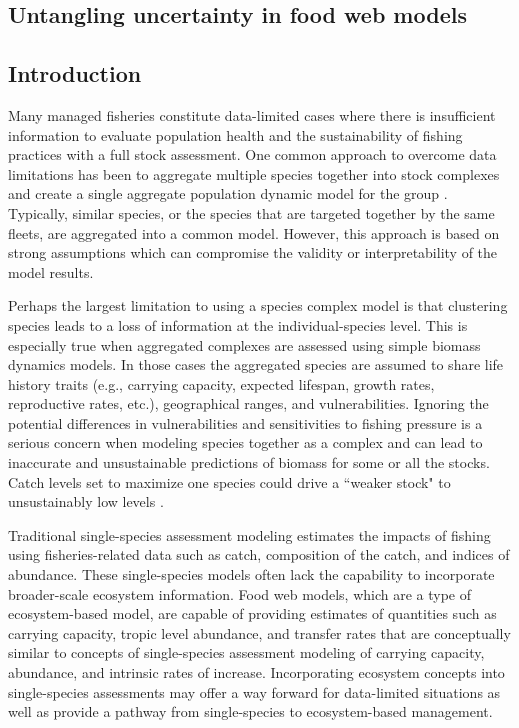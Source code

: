 \documentclass[oneside,12pt,final]{sty/ucthesis-CA2012}
\let\cite\citep                             %
\begin{document}
\begin{mainmatter}
\chapter{Untangling uncertainty in food web models}

\section{Introduction}
Many managed fisheries constitute data-limited cases \cite{farmer2016stock} where there is insufficient information to evaluate population health and the sustainability of fishing practices with a full stock assessment. One common approach to overcome data limitations has been to aggregate multiple species together into stock complexes and create a single aggregate population dynamic model for the group \cite{cope2011approach}. Typically, similar species, or the species that are targeted together by the same fleets, are aggregated into a common model. However, this approach is based on strong assumptions which can compromise the validity or interpretability of the model results. 

\vspace{5mm}

Perhaps the largest limitation to using a species complex model is that clustering species leads to a loss of information at the individual-species level. This is especially true when aggregated complexes are assessed using simple biomass dynamics models. In those cases the aggregated species are assumed to share life history traits (e.g., carrying capacity, expected lifespan, growth rates, reproductive rates, etc.), geographical ranges, and vulnerabilities. Ignoring the potential differences in vulnerabilities and sensitivities to fishing pressure is a serious concern when modeling species together as a complex and can lead to inaccurate and unsustainable predictions of biomass for some or all the stocks. Catch levels set to maximize one species could drive a ``weaker stock" to  unsustainably low levels \cite{hastings2017marine}.

\vspace{5mm}

Traditional single-species assessment modeling estimates the impacts of fishing using fisheries-related data such as catch, composition of the catch, and indices of abundance. These single-species models often lack the capability to incorporate broader-scale ecosystem information. Food web models, which are a type of ecosystem-based model, are capable of providing estimates of quantities such as carrying capacity, tropic level abundance, and transfer rates that are conceptually similar to concepts of single-species assessment modeling of carrying capacity, abundance, and intrinsic rates of increase. Incorporating ecosystem concepts into single-species assessments may offer a way forward for data-limited situations as well as provide a pathway from single-species to ecosystem-based management.


\end{mainmatter}
\end{document}
